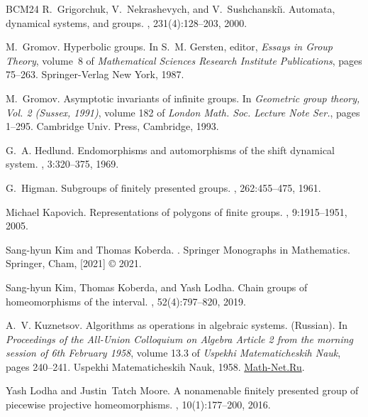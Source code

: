 \documentclass[11pt,letterpaper]{amsart}
\theoremstyle{definition}
\begin{document}
\begin{thebibliography}{BCM{\etalchar{+}}24}
R.~Grigorchuk, V.~Nekrashevych, and V.~Sushchanski\u\i.
\newblock Automata, dynamical systems, and groups.
, 231(4):128--203, 2000.

M.~Gromov.
\newblock Hyperbolic groups.
\newblock In S.~M. Gersten, editor, {\em Essays in Group Theory}, volume~8 of
  {\em Mathematical Sciences Research Institute Publications}, pages 75--263.
  Springer-Verlag New York, 1987.

M.~Gromov.
\newblock Asymptotic invariants of infinite groups.
\newblock In {\em Geometric group theory, {V}ol. 2 ({S}ussex, 1991)}, volume
  182 of {\em London Math. Soc. Lecture Note Ser.}, pages 1--295. Cambridge
  Univ. Press, Cambridge, 1993.

G.~A. Hedlund.
\newblock Endomorphisms and automorphisms of the shift dynamical system.
, 3:320--375, 1969.

G.~Higman.
\newblock Subgroups of finitely presented groups.
, 262:455--475, 1961.

Michael Kapovich.
\newblock Representations of polygons of finite groups.
, 9:1915--1951, 2005.

Sang-hyun Kim and Thomas Koberda.
.
\newblock Springer Monographs in Mathematics. Springer, Cham, [2021] \copyright
  2021.

Sang-hyun Kim, Thomas Koberda, and Yash Lodha.
\newblock Chain groups of homeomorphisms of the interval.
, 52(4):797--820, 2019.

A.~V. Kuznetsov.
\newblock Algorithms as operations in algebraic systems. ({R}ussian).
\newblock In {\em Proceedings of the All-Union Colloquium on Algebra Article 2
  from the morning session of 6th February 1958}, volume 13.3 of {\em Uspekhi
  Matematicheskih Nauk}, pages 240--241. Uspekhi Matematicheskih Nauk, 1958.
\newblock \href{http://mi.mathnet.ru/eng/umn/v13/i3/p225}{Math-Net.Ru}.

Yash Lodha and Justin~Tatch Moore.
\newblock A nonamenable finitely presented group of piecewise projective
  homeomorphisms.
, 10(1):177--200, 2016.


\end{thebibliography}
\end{document}
